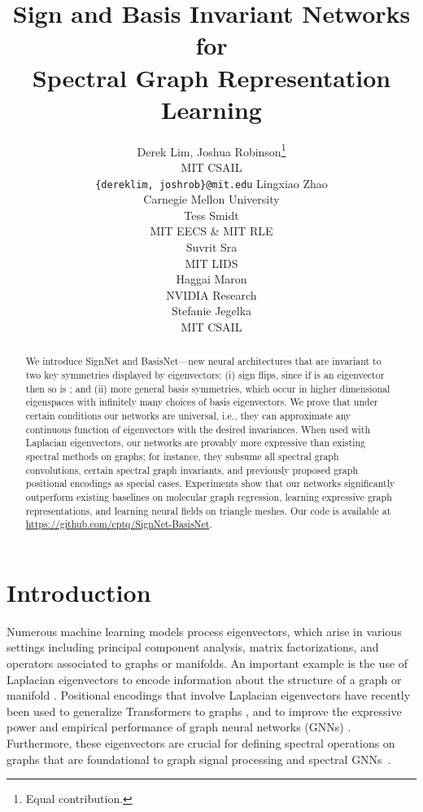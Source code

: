 \documentclass{article} \usepackage{iclr2023_conference,times}
\title{Sign and Basis Invariant Networks for\\ Spectral Graph Representation Learning}
\author{Derek Lim, Joshua Robinson\thanks{Equal contribution.}\\
MIT CSAIL\\
\texttt{\{dereklim, joshrob\}@mit.edu}
\And Lingxiao Zhao  \\
Carnegie Mellon University\\
\And Tess Smidt\\
MIT EECS \& MIT RLE\\
\And
Suvrit Sra \\
MIT LIDS\\
\And
Haggai Maron \\
NVIDIA Research \\
\And Stefanie Jegelka \\
MIT CSAIL
}
\begin{document}
\maketitle

\begin{abstract}
We introduce SignNet and BasisNet---new neural architectures that are invariant to two key symmetries displayed by eigenvectors: (i) sign flips, since if  is an eigenvector then so is ; and (ii) more general basis symmetries, which occur in higher dimensional eigenspaces with infinitely many choices of basis eigenvectors. We prove that under certain conditions our networks are universal, i.e., they can approximate any continuous function of eigenvectors with the desired invariances. 
When used with Laplacian eigenvectors, our networks are provably more expressive than existing spectral methods on graphs; for instance, they subsume all spectral graph convolutions, certain spectral graph invariants, and previously proposed graph positional encodings as special cases.
Experiments show that our networks significantly outperform existing baselines on molecular graph regression, learning expressive graph representations, and learning neural fields on triangle meshes.
Our code is available at 
\url{https://github.com/cptq/SignNet-BasisNet}.
\end{abstract}

\section{Introduction}


Numerous machine learning models process eigenvectors, which arise in various settings including principal component analysis, matrix factorizations, and operators associated to graphs or manifolds. An important example is the use of  Laplacian eigenvectors to encode information about the structure of a graph or manifold \citep{belkin2003laplacian,von2007tutorial,levy2006laplace}.
Positional encodings that involve Laplacian eigenvectors have recently been used to generalize Transformers to graphs \citep{kreuzer2021rethinking,dwivedi2020generalization}, and to improve the expressive power and empirical performance of graph neural networks (GNNs) \citep{dwivedi2022graph}. Furthermore, these eigenvectors are crucial for defining spectral operations on graphs that are foundational to graph signal processing and spectral GNNs~\citep{ortega2018graph, bruna2014spectral}.
\end{document}
